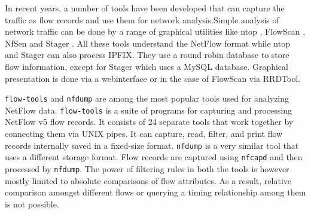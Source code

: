 
In recent years, a number of tools have been developed that can capture the
traffic as flow records and use them for network analysis.Simple analysis of
network traffic can be done by a range of graphical utilities like ntop
\cite{ntop:2000}, FlowScan \cite{flowscan:2000}, NfSen \cite{phaag:2006} and
Stager \cite{oslebo:2006}. All these tools understand the NetFlow format while
ntop and Stager can also process \ac{IPFIX}. They use a round robin database
to store flow information, except for Stager which uses a MySQL database.
Graphical presentation is done via a webinterface or in the case of FlowScan
via RRDTool.

\texttt{flow-tools} and \texttt{nfdump} are among the most popular tools used
for analyzing NetFlow data. \texttt{flow-tools} \cite{sromig:2000} is a suite
of programs for capturing and processing NetFlow v5 flow records. It consists
of 24 separate tools that work together by connecting them via UNIX pipes. It
can capture, read, filter, and print flow records internally saved in a
fixed-size format. \texttt{nfdump} \cite{phaag:2006} is a very similar tool
that uses a different storage format. Flow records are captured using
\texttt{nfcapd} and then processed by \texttt{nfdump}. The power of filtering
rules in both the tools is however mostly limited to absolute comparisons of
flow attributes. As a result, relative comparison amongst different flows or
querying a timing relationship among them is not possible.



